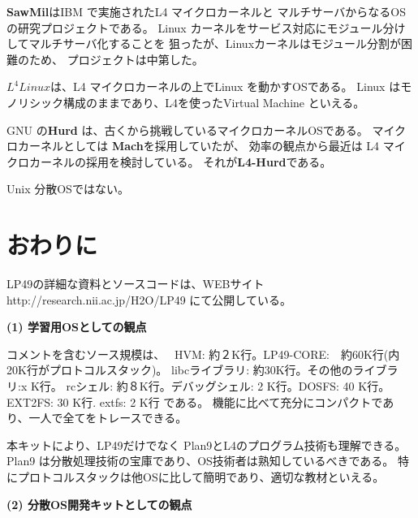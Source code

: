 \documentclass[draft]{ipsjpapers}
\begin{document}
{\bf SawMil}はIBM で実施されたL4 マイクロカーネルと
マルチサーバからなるOS の研究プロジェクトである。
Linux カーネルをサービス対応にモジュール分けしてマルチサーバ化することを
狙ったが、Linuxカーネルはモジュール分割が困難のため、
プロジェクトは中第した。

{\bf $L^4Linux$}は、L4 マイクロカーネルの上でLinux を動かすOSである。
Linux はモノリシック構成のままであり、L4を使ったVirtual Machine といえる。

GNU の{\bf Hurd} は、古くから挑戦しているマイクロカーネルOSである。
マイクロカーネルとしては {\bf Mach}を採用していたが、
効率の観点から最近は L4 マイクロカーネルの採用を検討している。
それが{\bf L4-Hurd}である。

Unix 
分散OSではない。






\section{おわりに}


LP49の詳細な資料とソースコードは、WEBサイト 
http://research.nii.ac.jp/H2O/LP49  にて公開している。

{\bf (1) 学習用OSとしての観点}

  コメントを含むソース規模は、　
  HVM: 約２K行。LP49-CORE:　約60K行(内20K行がプロトコルスタック)。
  libcライブラリ: 約30K行。その他のライブラリ:x K行。
  rcシェル: 約８K行。デバッグシェル: 2 K行。DOSFS: 40 K行。 EXT2FS: 30 K行.
  extfs: 2 K行
である。
機能に比べて充分にコンパクトであり、一人で全てをトレースできる。

本キットにより、LP49だけでなく Plan9とL4のプログラム技術も理解できる。
Plan9 は分散処理技術の宝庫であり、OS技術者は熟知しているべきである。
特にプロトコルスタックは他OSに比して簡明であり、適切な教材といえる。

{\bf (2) 分散OS開発キットとしての観点}
\end{document}
